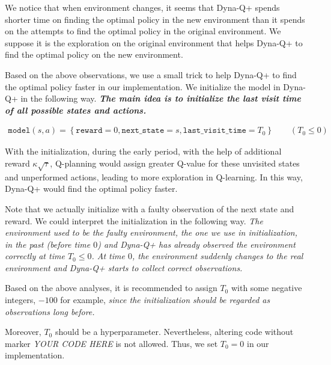 \documentclass{article}
\begin{document}
    \hspace{0.7em}
    We notice that when environment changes, it seems that Dyna-Q+ spends shorter time on finding the optimal policy in the new environment than it spends on the attempts to find the optimal policy in the original environment. We suppose it is the exploration on the original environment that helps Dyna-Q+ to find the optimal policy on the new environment.

    \hspace{0.7em}
    Based on the above observations, we use a small trick to help Dyna-Q+ to find the optimal policy faster in our implementation. We initialize the model in Dyna-Q+ in the following way. \textbf{\emph{The main idea is to initialize the last visit time of all possible states and actions.}}

    \vspace{-2.75em}
    \begin{align*}
        \mathtt{model}(s,a) = \left\{ \mathtt{reward}=0, \mathtt{next\_state}=s, \mathtt{last\_visit\_time}=T_0 \right\} \qquad\left(T_0\le 0\right)
    \end{align*}

    \vspace{-0.75em} \hspace{0.7em}
    With the initialization, during the early period, with the help of additional reward $\kappa\sqrt{\tau}$, Q-planning would assign greater Q-value for these unvisited states and unperformed actions, leading to more exploration in Q-learning. In this way, Dyna-Q+ would find the optimal policy faster.

    \hspace{0.7em}
    Note that we actually initialize with a faulty observation of the next state and reward. We could interpret the initialization in the following way. \emph{The environment used to be the faulty environment, the one we use in initialization, in the past (before time $0$) and Dyna-Q+ has already observed the environment correctly at time $T_0\le 0$. At time $0$, the environment suddenly changes to the real environment and Dyna-Q+ starts to collect correct observations.}

    \hspace{0.7em}
    Based on the above analyses, it is recommended to assign $T_0$ with some negative integers, $-100$ for example, \emph{since the initialization should be regarded as observations long before.}

    \hspace{0.7em}
    Moreover, $T_0$ should be a hyperparameter. Nevertheless, altering code without marker \textit{YOUR CODE HERE} is not allowed. Thus, we set $T_0=0$ in our implementation. 
    
\end{document}
